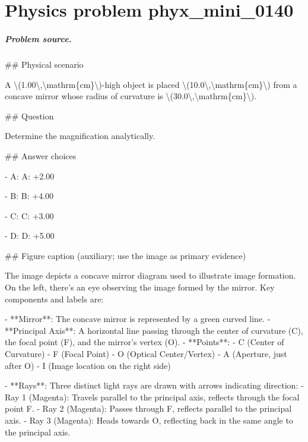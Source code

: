 
\chapter{Physics problem phyx\_mini\_0140}
\label{ch:PhyXMiniProblems_problem_phyx_mini_0140}

\paragraph{Problem source.}
\#\# Physical scenario

A \textbackslash{}(1.00\textbackslash{},\textbackslash{}mathrm\{cm\}\textbackslash{})-high object is placed \textbackslash{}(10.0\textbackslash{},\textbackslash{}mathrm\{cm\}\textbackslash{}) from a concave mirror whose radius of curvature is \textbackslash{}(30.0\textbackslash{},\textbackslash{}mathrm\{cm\}\textbackslash{}).

\#\# Question

Determine the magnification analytically.

\#\# Answer choices

- A: A: +2.00

- B: B: +4.00

- C: C: +3.00

- D: D: +5.00

\#\# Figure caption (auxiliary; use the image as primary evidence)

The image depicts a concave mirror diagram used to illustrate image formation. On the left, there's an eye observing the image formed by the mirror. Key components and labels are:

- **Mirror**: The concave mirror is represented by a green curved line.
- **Principal Axis**: A horizontal line passing through the center of curvature (C), the focal point (F), and the mirror's vertex (O).
- **Points**: 
  - C (Center of Curvature)
  - F (Focal Point)
  - O (Optical Center/Vertex)
  - A (Aperture, just after O)
  - I (Image location on the right side)

- **Rays**: Three distinct light rays are drawn with arrows indicating direction:
  - Ray 1 (Magenta): Travels parallel to the principal axis, reflects through the focal point F.
  - Ray 2 (Magenta): Passes through F, reflects parallel to the principal axis.
  - Ray 3 (Magenta): Heads towards O, reflecting back in the same angle to the principal axis.
  
